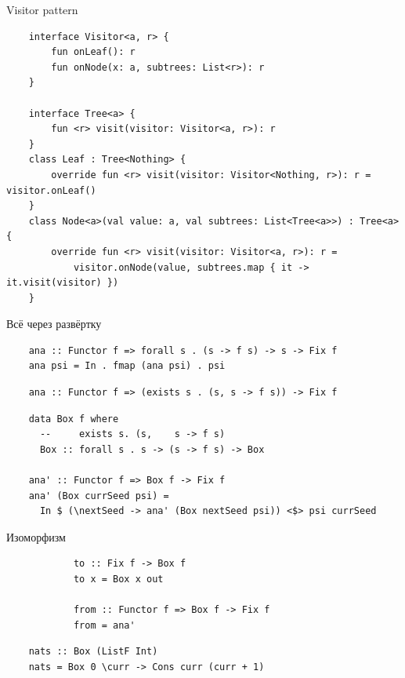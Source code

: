     \begin{frame}[fragile]{Visitor pattern}
        \pause
        \begin{verbatim}
    interface Visitor<a, r> {
        fun onLeaf(): r
        fun onNode(x: a, subtrees: List<r>): r
    }

    interface Tree<a> {
        fun <r> visit(visitor: Visitor<a, r>): r
    }
    class Leaf : Tree<Nothing> {
        override fun <r> visit(visitor: Visitor<Nothing, r>): r = visitor.onLeaf()
    }
    class Node<a>(val value: a, val subtrees: List<Tree<a>>) : Tree<a> {
        override fun <r> visit(visitor: Visitor<a, r>): r =
            visitor.onNode(value, subtrees.map { it -> it.visit(visitor) })
    }
        \end{verbatim}
    \end{frame}

    \begin{frame}[fragile]{Всё через развёртку}
        \pause
        \begin{verbatim}
    ana :: Functor f => forall s . (s -> f s) -> s -> Fix f
    ana psi = In . fmap (ana psi) . psi
        \end{verbatim}
        \pause\vspace{1em}
        \begin{verbatim}
    ana :: Functor f => (exists s . (s, s -> f s)) -> Fix f
        \end{verbatim}
        \pause\vspace{1em}
        \begin{verbatim}
    data Box f where
      --     exists s. (s,    s -> f s)
      Box :: forall s . s -> (s -> f s) -> Box

    ana' :: Functor f => Box f -> Fix f
    ana' (Box currSeed psi) =
      In $ (\nextSeed -> ana' (Box nextSeed psi)) <$> psi currSeed
        \end{verbatim}
    \end{frame}

    \begin{frame}[fragile]{Изоморфизм}
        \pause
        \begin{verbatim}
            to :: Fix f -> Box f
            to x = Box x out

            from :: Functor f => Box f -> Fix f
            from = ana'
        \end{verbatim}
        \pause\vspace{1em}
        \begin{verbatim}
    nats :: Box (ListF Int)
    nats = Box 0 \curr -> Cons curr (curr + 1)
        \end{verbatim}
    \end{frame}

